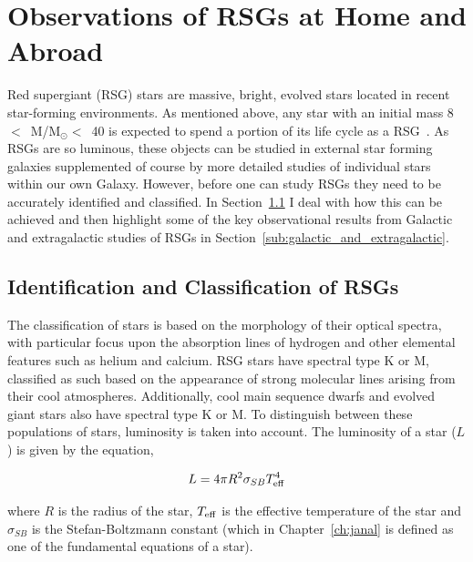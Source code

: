 
\section{Observations of RSGs at Home and Abroad} %
\label{sec:rsg_observations}

Red supergiant (RSG) stars are massive, bright, evolved stars located in recent star-forming environments.
As mentioned above, any star with an initial mass 8~$<$~M/M$_{\odot}<$~40 is expected to spend a portion of its life cycle as a RSG~\citep{2000A&A...361..101M,Massey03, 2007ARA&A..45..177C, Meynet11}.
As RSGs are so luminous, these objects can be studied in external star forming galaxies supplemented of course by more detailed studies of individual stars within our own Galaxy.
However, before one can study RSGs they need to be accurately identified and classified. In Section~\ref{sub:selection_of_rsgs} I deal with how this can be achieved and then highlight some of the key observational results from Galactic and extragalactic studies of RSGs in Section~\ref{sub:galactic_and_extragalactic}.

\subsection{Identification and Classification of RSGs} %
\label{sub:selection_of_rsgs}

The classification of stars is based on the morphology of their optical spectra, with particular focus upon the absorption lines of hydrogen and other elemental features such as helium and calcium.
RSG stars have spectral type K or M, classified as such based on the appearance of strong molecular lines arising from their cool atmospheres.
Additionally, cool main sequence dwarfs and evolved giant stars also have spectral type K or M.
To distinguish between these populations of stars, luminosity is taken into account.
The luminosity of a star ($L$) is given by the equation,

\begin{equation}
    L = 4\pi R^2\sigma_{SB}T_{\rm eff}^4
\end{equation}

\noindent where $R$ is the radius of the star, $T_{\rm eff}$ is the effective temperature of the star and $\sigma_{SB}$ is the Stefan-Boltzmann constant (which in Chapter~\ref{ch:janal} is defined as one of the fundamental equations of a star).


